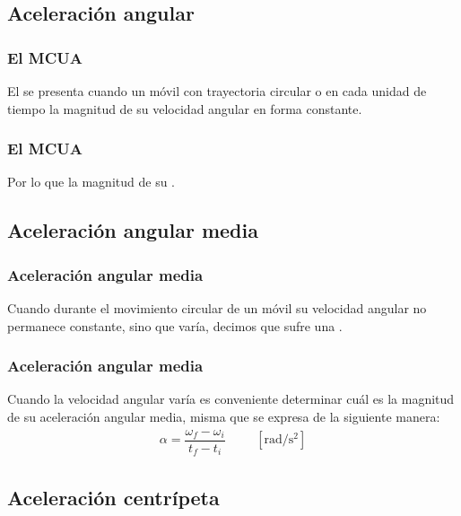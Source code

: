 \documentclass[14pt]{beamer}
\begin{document}
\subsection{Aceleración angular}

\begin{frame}
\frametitle{El MCUA}
El  \pause se presenta cuando un móvil con trayectoria circular  o  en cada unidad de tiempo la magnitud de su velocidad angular en forma constante.
\end{frame}
\begin{frame}
\frametitle{El MCUA}
Por lo que la magnitud de su .
\end{frame}

\subsection{Aceleración angular media}

\begin{frame}
\frametitle{Aceleración angular media}
Cuando durante el movimiento circular de un móvil su velocidad angular no permanece constante, \pause sino que varía, decimos que sufre una .
\end{frame}
\begin{frame}
\frametitle{Aceleración angular media}
Cuando la velocidad angular varía es conveniente determinar cuál es la magnitud de su aceleración angular media, misma que se expresa de la siguiente manera:
\pause
\begin{align*}
\alpha = \dfrac{\omega_{f} - \omega_{i}}{t_{f} - t_{i}} \hspace{1cm} \left[ \unit{\radian\per\square\second} \right]
\end{align*}
\end{frame}

\subsection{Aceleración centrípeta}
\end{document}

